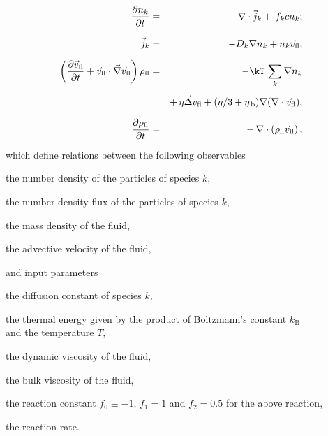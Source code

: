 \begin{eqnarray}
\label{eq:ek-reaction-continuity} \frac{\partial n_k}{\partial t} & = & -\, \nabla \cdot \vec{j}_k +\, f_{k} c n_{k} \vphantom{\left(\frac{\partial}{\partial}\right)} ; \\
\label{eq:ek-reaction-fluxes} \vec{j}_{k} & = & -D_k \nabla n_k + n_k \vec{v}_{\mathrm{fl}} \vphantom{\left(\frac{\partial}{\partial}\right)} ; \\
\nonumber \left(\frac{\partial \vec{v}_{\mathrm{fl}}}{\partial t} + \vec{v}_{\mathrm{fl}} \cdot \vec{\nabla} \vec{v}_{\mathrm{fl}} \right) \rho_\mathrm{fl} & = & -\kT \, \sum_{k} \nabla n_k   \\
\label{eq:ek-reaction-velocity} & & +\, \eta \vec{\Delta} \vec{v}_{\mathrm{fl}} + (\eta / 3 + \eta_{\text{\,b}}) \nabla (\nabla \cdot \vec{v}_{\mathrm{fl}}) \vphantom{\left(\frac{\partial}{\partial}\right)} ; \\
\label{eq:ek-reaction-continuity-fl} \frac{\partial \rho_\mathrm{fl}}{\partial t} & = & -\,\nabla\cdot\left( \rho_\mathrm{fl} \vec{v}_{\mathrm{fl}} \right) \vphantom{\left(\frac{\partial}{\partial}\right)} ,
\end{eqnarray}
which define relations between the following observables
\begin{description}[itemsep=0cm,labelindent=1.5em,leftmargin=4.5em,style=nextline]
  \item[$n_k$] the number density of the particles of species $k$,
  \item[$\vec{j}_k$] the number density flux of the particles of species $k$,
  \item[$\rho_{\mathrm{fl}}$] the mass density of the fluid,
  \item[$\vec{v}_{\mathrm{fl}}$] the advective velocity of the fluid,
\end{description}
and input parameters
\begin{description}[itemsep=0cm,labelindent=1.5em,leftmargin=4.5em,style=nextline]
  \item[$D_k$] the diffusion constant of species $k$,
  \item[$\kT$] the thermal energy given by the product of Boltzmann's constant
  $k_\text{B}$\\and the temperature $T$,
  \item[$\eta$] the dynamic viscosity of the fluid,
  \item[$\eta_{\text{\,b}}$] the bulk viscosity of the fluid,
  \item[$f_{k}$] the reaction constant $f_{0} \equiv -1$, $f_{1} = 1$ and $f_{2} = 0.5$ for the above reaction,
  \item[$c$] the reaction rate.
\end{description}

